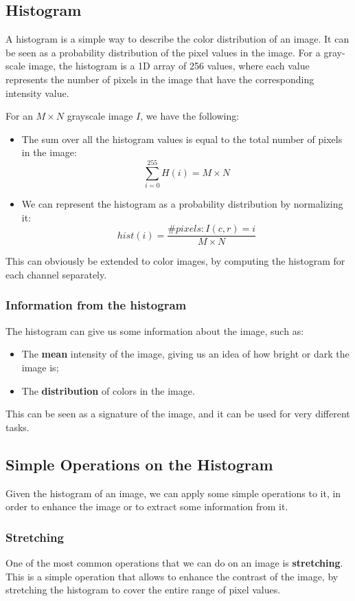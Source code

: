 \subsection{Histogram}
A histogram is a simple way to describe the color distribution of an image. 
It can be seen as a probability distribution of the pixel values in the image.
For a gray-scale image, the histogram is a 1D array of 256 values, where each value 
represents the number of pixels in the image that have the corresponding intensity value.

For an $M \times N$ grayscale image $I$, we have the following:
\begin{itemize}
    \item The sum over all the histogram values is equal to the total number of pixels in the image:
    \[ \sum_{i=0}^{255} H(i) = M \times N \]
    \item We can represent the histogram as a probability distribution by normalizing it:
    \[ hist(i) = \frac{\#pixels: I(c,r) = i}{M \times N} \]
\end{itemize}
This can obviously be extended to color images, by computing the histogram for each channel separately.

\subsubsection{Information from the histogram}
The histogram can give us some information about the image, such as:
\begin{itemize}
    \item The \textbf{mean} intensity of the image, giving us an idea of how bright or dark the image is;
    \item The \textbf{distribution} of colors in the image.
\end{itemize}
This can be seen as a signature of the image, and it can be used for very different tasks.

\subsection{Simple Operations on the Histogram}
Given the histogram of an image, we can apply some simple operations to it, in order to enhance the image or to extract some information from it.

\subsubsection{Stretching}
One of the most common operations that we can do on an image is \textbf{stretching}.
This is a simple operation that allows to enhance the contrast of the image, by stretching the histogram to cover the entire range of pixel values.

